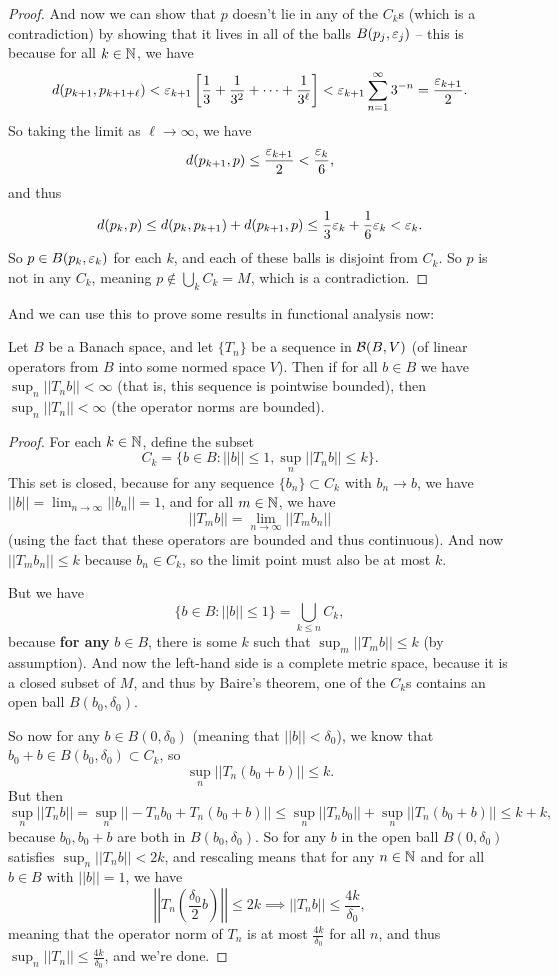 \begin{proof}
And now we can show that $p$ doesn't lie in any of the $C_k$s (which is a contradiction) by showing that it lives in all of the balls $B(p_j, \varepsilon_j)$ -- this is because for all $k \in \mathbb N$, we have
\[
    d(p_{k+1}, p_{k+1+\ell}) < \varepsilon_{k+1}\left[\frac{1}{3} + \frac{1}{3^2} + \cdots + \frac{1}{3^{\ell}}\right] < \varepsilon_{k+1} \sum_{n=1}^{\infty} 3^{-n} = \frac{\varepsilon_{k+1}}{2}.
\]
So taking the limit as $\ell \to \infty$, we have
\[
    d(p_{k+1}, p) \le \frac{\varepsilon_{k+1}}{2} < \frac{\varepsilon_k}{6},
\]
and thus 
\[
    d(p_k, p) \le d(p_k, p_{k+1}) + d(p_{k+1}, p) \le \frac{1}{3} \varepsilon_k + \frac{1}{6} \varepsilon_k < \varepsilon_k.
\]
So $p \in B(p_k, \varepsilon_k)$ for each $k$, and each of these balls is disjoint from $C_k$. So $p$ is not in any $C_k$, meaning $p \not\in \bigcup_{k} C_k = M$, which is a contradiction.
\end{proof}

And we can use this to prove some results in functional analysis now:

\begin{theorem}
Let $B$ be a Banach space, and let $\{T_n\}$ be a sequence in $\mathcal{B}(B, V)$ (of linear operators from $B$ into some normed space $V$). Then if for all $b \in B$ we have $\sup_n||T_n b|| < \infty$ (that is, this sequence is pointwise bounded), then $\sup_n||T_n|| < \infty$ (the operator norms are bounded). 
\end{theorem}
\begin{proof}
For each $k \in \mathbb N$, define the subset 
\[
    C_k = \{b \in B: ||b|| \le 1, \sup_n ||T_nb|| \le k\}.
\]
This set is closed, because for any sequence $\{b_n\} \subset C_k$ with $b_n \to b$, we have $||b|| = \lim_{n \to \infty} ||b_n|| = 1$, and for all $m \in \mathbb N$, we have 
\[
    ||T_mb|| = \lim_{n \to \infty} ||T_mb_n||
\]
(using the fact that these operators are bounded and thus continuous). And now $||T_mb_n|| \le k$ because $b_n \in C_k$, so the limit point must also be at most $k$.

But we have
\[
    \{b \in B: ||b|| \le 1\} = \bigcup_{k \le n} C_k,
\]
because \textbf{for any} $b \in B$, there is some $k$ such that $\sup_m ||T_mb|| \le k$ (by assumption). And now the left-hand side is a complete metric space, because it is a closed subset of $M$, and thus by Baire's theorem, one of the $C_k$s contains an open ball $B(b_0, \delta_0)$. 

So now for any $b \in B(0, \delta_0)$ (meaning that $||b|| < \delta_0$), we know that $b_0 + b \in B(b_0, \delta_0) \subset C_k$, so
\[
    \sup_n ||T_n(b_0 + b)|| \le k.
\]
But then 
\[
    \sup_n||T_nb|| = \sup_n ||-T_n b_0 + T_n(b_0 + b)|| \le \sup_n ||T_n b_0|| + \sup_n ||T_n (b_0 + b)|| \le k + k,
\]
because $b_0, b_0 + b$ are both in $B(b_0, \delta_0)$. So for any $b$ in the open ball $B(0, \delta_0)$ satisfies $\sup_n||T_nb|| < 2k$, and rescaling means that for any $n \in \mathbb N$ and for all $b \in B$ with $||b|| = 1$, we have
\[
    \left|\left|T_n\left(\frac{\delta_0}{2}b\right)\right|\right| \le 2k \implies ||T_nb|| \le \frac{4k}{\delta_0},
\]
meaning that the operator norm of $T_n$ is at most $\frac{4k}{\delta_0}$ for all $n$, and thus $\sup_n||T_n|| \le \frac{4k}{\delta_0}$, and we're done. 
\end{proof}